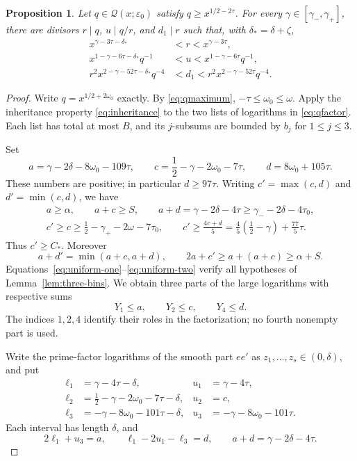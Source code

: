 \documentclass[11pt,reqno]{amsart}
\newtheorem{proposition}[theorem]{Proposition}
\theoremstyle{definition}
\theoremstyle{remark}
\numberwithin{equation}{section}
\newcommand{\Qset}{\mathcal Q}
\newcommand{\tmax}{\tau_0}
\newcommand{\gmin}{\gamma_-}
\newcommand{\gmax}{\gamma_+}
\begin{document}
\begin{proposition}\label{prop:critical-factor}
Let $q\in\Qset(x;\varepsilon_0)$ satisfy $q\ge x^{1/2-2\tau}$.
For every $\gamma\in[\gmin,\gmax]$, there are divisors $r\mid q$,
$u\mid q/r$, and $d_1\mid r$ such that, with $\delta_* =\delta+\zeta$,
\begin{align}
 x^{\gamma-3\tau-\delta_*}&<r<x^{\gamma-3\tau},\label{eq:r-window}\\
 x^{1-\gamma-6\tau-\delta_*}q^{-1}&<u<
                 x^{1-\gamma-6\tau}q^{-1},\label{eq:u-window}\\
 r^2x^{2-\gamma-52\tau-\delta_*}q^{-4}&<d_1<
                 r^2x^{2-\gamma-52\tau}q^{-4}.\label{eq:d-window}
\end{align}
\end{proposition}
\begin{proof}
Write $q=x^{1/2+2\omega_0}$ exactly. By \eqref{eq:qmaximum},
$-\tau\le\omega_0\le\omega$. Apply the inheritance property
\eqref{eq:inheritance} to the two lists of logarithms in
\eqref{eq:qfactor}. Each list has total at most $B$, and its $j$-subsums
are bounded by $b_j$ for $1\le j\le3$.

Set
\begin{equation}\label{eq:capacities}
 a=\gamma-2\delta-8\omega_0-109\tau,\qquad
 c=\frac12-\gamma-2\omega_0-7\tau,\qquad
 d=8\omega_0+105\tau.
\end{equation}
These numbers are positive; in particular $d\ge97\tau$.
Writing $c'=\max(c,d)$ and $d'=\min(c,d)$, we have
\begin{gather}
 a\ge\alpha,\qquad a+c\ge S,\qquad
 a+d=\gamma-2\delta-4\tau\ge\gmin-2\delta-4\tmax,
 \label{eq:capacity-sums}\\
 c'\ge c\ge\frac12-\gmax-2\omega-7\tmax,\qquad
 c'\ge\frac{4c+d}{5}
      =\frac45\left(\frac12-\gamma\right)+\frac{77}{5}\tau.
 \label{eq:capacity-max}
\end{gather}
Thus $c'\ge C_*$. Moreover
\[
 a+d'=\min(a+c,a+d),\qquad
 2a+c'\ge a+(a+c)\ge\alpha+S.
\]
Equations~\eqref{eq:uniform-one}--\eqref{eq:uniform-two} verify all
hypotheses of Lemma~\ref{lem:three-bins}. We obtain three parts of the
large logarithms with respective sums
\begin{equation}\label{eq:Yparts}
 Y_1\le a,\qquad Y_2\le c,\qquad Y_4\le d.
\end{equation}
The indices $1,2,4$ identify their roles in the factorization; no fourth
nonempty part is used.

Write the prime-factor logarithms of the smooth part $ee'$ as
$z_1,\ldots,z_s\in(0,\delta)$, and put
\begin{align*}
 \ell_1&=\gamma-4\tau-\delta,&u_1&=\gamma-4\tau,\\
 \ell_2&=\frac12-\gamma-2\omega_0-7\tau-\delta,&u_2&=c,\\
 \ell_3&=-\gamma-8\omega_0-101\tau-\delta,&
 u_3&=-\gamma-8\omega_0-101\tau.
\end{align*}
Each interval has length $\delta$, and
\begin{equation}\label{eq:window-identities}
 2\ell_1+u_3=a,\qquad
 \ell_1-2u_1-\ell_3=d,\qquad
 a+d=\gamma-2\delta-4\tau.
\end{equation}


\end{proof}
\end{document}
